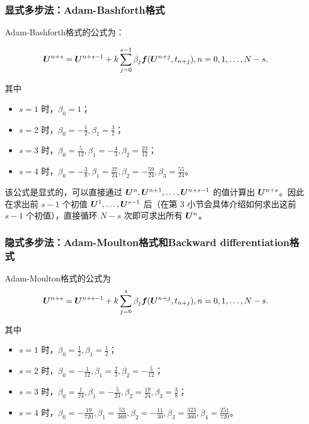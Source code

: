 \documentclass[lang=cn,a4paper,newtx,bibend=bibtex]{elegantpaper}
\begin{document}
\subsubsection{显式多步法：Adam-Bashforth格式}

Adam-Bashforth格式的公式为：

\begin{equation*}
    \bm{U}^{n+s} = \bm{U}^{n+s-1} + k\sum_{j=0}^{s-1} \beta_j\bm{f}(\bm{U}^{n+j}, t_{n+j}), n = 0, 1, \dots, N-s. 
\end{equation*}

其中
\begin{itemize}
    \item $s=1$ 时，$\beta_0 = 1$；
    \item $s=2$ 时，$\beta_0 = -\frac 12, \beta_1 = \frac 32$；
    \item $s=3$ 时，$\beta_0 = \frac{5}{12}, \beta_1 = -\frac 43, \beta_2 = \frac{23}{12}$；
    \item $s=4$ 时，$\beta_0 = -\frac 38, \beta_1 = \frac{37}{24}, \beta_2 = -\frac{59}{24}, \beta_3 = \frac{55}{24}$。
\end{itemize}

该公式是显式的，可以直接通过 $\bm{U}^n, \bm{U}^{n+1},\dots, \bm{U}^{n+s-1}$ 的值计算出 $\bm{U}^{n+s}$。因此在求出前 $s-1$ 个初值 $\bm{U}^1, \dots, \bm{U}^{s-1}$ 后（在第 3 小节会具体介绍如何求出这前 $s-1$ 个初值），直接循环 $N-s$ 次即可求出所有 $\bm{U}^n$。

\subsubsection{隐式多步法：Adam-Moulton格式和Backward differentiation格式}

Adam-Moulton格式的公式为
\begin{equation*}
    \bm{U}^{n+s} = \bm{U}^{n+s-1} + k\sum_{j=0}^s \beta_j\bm{f}(\bm{U}^{n+j}, t_{n+j}), n = 0, 1, \dots, N-s.
\end{equation*}

其中
\begin{itemize}
    \item $s=1$ 时，$\beta_0 = \frac 12, \beta_1 = \frac 12$；
    \item $s=2$ 时，$\beta_0 = -\frac 1{12}, \beta_1 = \frac 23, \beta_2 = -\frac 5{12}$；
    \item $s=3$ 时，$\beta_0 = \frac{1}{24}, \beta_1 = -\frac {5}{24}, \beta_2 = \frac{19}{24}, \beta_3 = \frac 38$；
    \item $s=4$ 时，$\beta_0 = -\frac {19}{720}, \beta_1 = \frac{53}{360}, \beta_2 = -\frac{11}{30}, \beta_3 = \frac{323}{360}, \beta_4 = \frac{251}{720}$。
\end{itemize}
\end{document}
